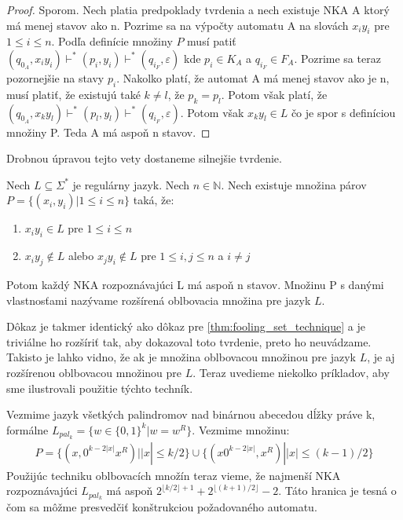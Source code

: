 \begin{proof}
Sporom. Nech platia predpoklady tvrdenia a nech existuje NKA A ktorý má menej stavov ako n. Pozrime sa na výpočty automatu A na slovách $x_{i}y_{i}$ pre $1 \leq i \leq n$. Podľa definície množiny $ P $ musí patiť $ (q_{0_{A}},x_{i}y_{i}) \vdash^{*} (p_{i}, y_{i}) \vdash^{*} (q_{i_{F}}, \varepsilon) $ kde $p_{i} \in K_{A}$ a $q_{i_{F}} \in F_{A}$. Pozrime sa teraz pozornejšie na stavy $ p_{i} $. Nakolko platí, že automat A má menej stavov ako je n, musí platiť, že existujú také $k \neq l $, že $ p_{k}=p_{l}  $. Potom však platí, že $ (q_{0_{A}},x_{k}y_{l}) \vdash^{*} (p_{l}, y_{l}) \vdash^{*} (q_{i_{F}}, \varepsilon)$. Potom však $x_{k}y_{l} \in L$ čo je spor s definíciou množiny P. Teda A má aspoň n stavov.
\end{proof}

Drobnou úpravou tejto vety dostaneme silnejšie tvrdenie.

\begin{theorem}
\label{thm:extended_fooling_set_technique}
Nech $ L \subseteq \Sigma^{*} $ je regulárny jazyk. Nech $ n \in \mathbb{N} $. Nech existuje množina párov $ P = \lbrace (x_{i},y_{i}) | 1 \leq i \leq n \rbrace $ taká, že: 

\begin{enumerate}[label=(\alph*)]
\item $x_{i}y_{i} \in L$ pre $1 \leq i \leq n$
\item $x_{i}y_{j} \notin L$ alebo $x_{j}y_{i} \notin L$ pre $1 \leq i,j \leq n$ a $i \neq j$
\end{enumerate}

Potom každý NKA rozpoznávajúci L má aspoň n stavov. Množinu P s danými vlastnosťami nazývame rozšírená oblbovacia množina pre jazyk $ L $.

\end{theorem}

Dôkaz je takmer identický ako dôkaz pre \ref{thm:fooling_set_technique} a je triviálne ho rozšíriť tak, aby dokazoval toto tvrdenie, preto ho neuvádzame. Takisto je lahko vidno, že ak je množina oblbovacou množinou pre jazyk $ L $, je aj rozšírenou oblbovacou množinou pre $ L $. Teraz uvedieme niekolko príkladov, aby sme ilustrovali použitie týchto techník.

\begin{example}
Vezmime jazyk všetkých palindromov nad binárnou abecedou dĺžky práve k, formálne $ L_{pal_k} = \lbrace w \in \lbrace 0,1 \rbrace^{k} | w = w^{R} \rbrace $. Vezmime množinu:
\begin{align*}
P = \lbrace (x,0^{k-2|x|}x^{R}) | |x| \leq k/2 \rbrace \cup \lbrace (x0^{k-2|x|},x^{R}) | |x| \leq (k-1)/2 \rbrace
\end{align*}
Použijúc techniku oblbovacích množín teraz vieme, že najmenší NKA rozpoznávajúci $L_{pal_k}$ má aspoň $ 2^{\lfloor k/2 \rfloor + 1} + 2^{\lfloor (k+1)/2 \rfloor} -2 $. Táto hranica je tesná o čom sa môžme presvedčiť konštrukciou požadovaného automatu.

\end{example}


